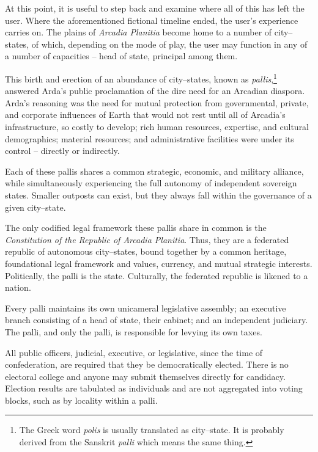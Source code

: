 

At this point, it is useful to step back and examine where all of this has left the user. Where the aforementioned fictional timeline ended, the user's experience carries on. The plains of {\it Arcadia Planitia} become home to a number of city--states, of which, depending on the mode of play, the user may function in any of a number of capacities -- head of state, principal among them.

This birth and erection of an abundance of city--states, known as {\it pallis},\footnote{The Greek word {\it polis} is usually translated as city--state. It is probably derived from the Sanskrit {\it palli} which means the same thing.} answered Arda's public proclamation of the dire need for an Arcadian diaspora. Arda's reasoning was the need for mutual protection from governmental, private, and corporate influences of Earth that would not rest until all of Arcadia's infrastructure, so costly to develop; rich human resources, expertise, and cultural demographics; material resources; and administrative facilities were under its control -- directly or indirectly.

Each of these pallis shares a common strategic, economic, and military alliance, while simultaneously experiencing the full autonomy of independent sovereign states. Smaller outposts can exist, but they always fall within the governance of a given city--state.

The only codified legal framework these pallis share in common is the {\it Constitution of the Republic of Arcadia Planitia}. Thus, they are a federated republic of autonomous city--states, bound together by a common heritage, foundational legal framework and values, currency, and mutual strategic interests. Politically, the palli is the state. Culturally, the federated republic is likened to a nation.

Every palli maintains its own unicameral legislative assembly; an executive branch consisting of a head of state, their cabinet; and an independent judiciary. The palli, and only the palli, is responsible for levying its own taxes.

All public officers, judicial, executive, or legislative, since the time of confederation, are required that they be democratically elected. There is no electoral college and anyone may submit themselves directly for candidacy. Election results are tabulated as individuals and are not aggregated into voting blocks, such as by locality within a palli.

